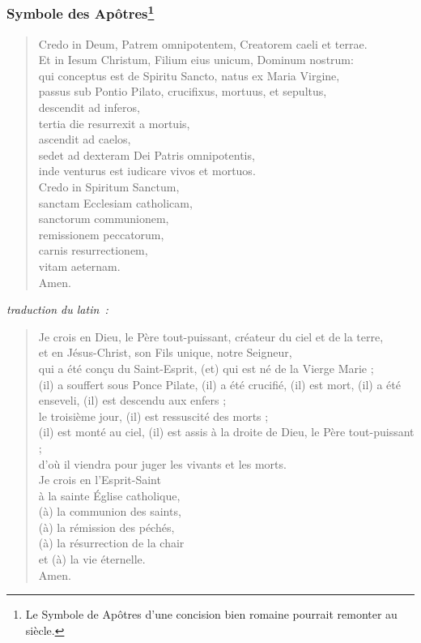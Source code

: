 \subsubsection*{Symbole des Apôtres\footnote{Le Symbole de Apôtres d’une concision bien romaine pourrait remonter au  siècle. }}

\begin{verse}
Credo in Deum, Patrem omnipotentem, Creatorem caeli et terrae.\\
Et in Iesum Christum, Filium eius unicum, Dominum nostrum:\\
qui conceptus est de Spiritu Sancto, natus ex Maria Virgine,\\
passus sub Pontio Pilato, crucifixus, mortuus, et sepultus,\\
descendit ad inferos,\\
tertia die resurrexit a mortuis,\\
ascendit ad caelos,\\
sedet ad dexteram Dei Patris omnipotentis,\\
inde venturus est iudicare vivos et mortuos.\\
Credo in Spiritum Sanctum,\\
sanctam Ecclesiam catholicam,\\
sanctorum communionem,\\
remissionem peccatorum,\\
carnis resurrectionem,\\
vitam aeternam.\\
Amen.
\end{verse}

\emph{traduction du latin~:}
\begin{verse}
Je crois en Dieu, le Père tout-puissant, créateur du ciel et de la terre, \\
et en Jésus-Christ, son Fils unique, notre Seigneur, \\
qui a été conçu du Saint-Esprit, (et) qui est né de la Vierge Marie ; \\
(il) a souffert sous Ponce Pilate, (il) a été crucifié, (il) est mort, (il) a été enseveli, (il) est descendu aux enfers ;\\
le troisième jour, (il) est ressuscité des morts ;\\
(il) est monté au ciel, (il) est assis à la droite de Dieu, le Père tout-puissant ; \\
d'où il viendra pour juger les vivants et les morts. \\
Je crois en l'Esprit-Saint \\
à la sainte Église catholique, \\
(à) la communion des saints, \\
(à) la rémission des péchés, \\
(à) la résurrection de la chair \\
et (à) la vie éternelle. \\
Amen.
\end{verse}




